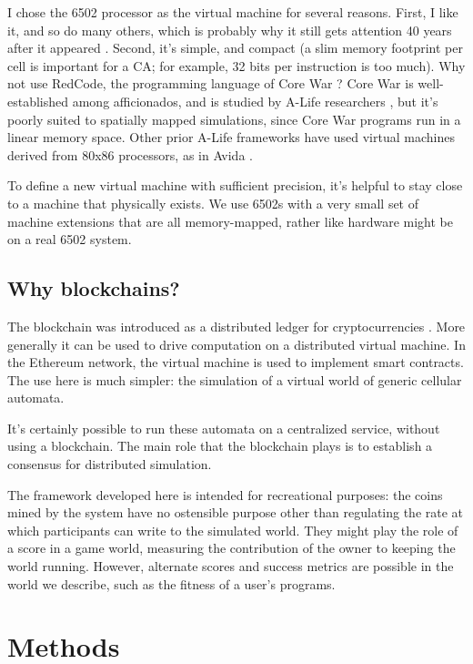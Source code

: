 \documentclass{article}
\begin{document}
I chose the 6502 processor as the virtual machine for several reasons.
First, I like it, and so do many others, which is probably why it still gets attention 40 years after it appeared \cite{JonasKording2017}.
Second, it's simple, and compact (a slim memory footprint per cell is important for a CA; for example, 32 bits per instruction is too much).
Why not use RedCode, the programming language of Core War \cite{Dewdney1984}?
Core War is well-established among afficionados, and is studied by A-Life researchers \cite{VowkWaitSchmidt2004},
but it's poorly suited to spatially mapped simulations, since Core War programs run in a linear memory space.
Other prior A-Life frameworks have used virtual machines derived from 80x86 processors, as in Avida \cite{AdamiBrown1994}.

To define a new virtual machine with sufficient precision, it's helpful to stay close to a machine that physically exists.
We use 6502s with a very small set of machine extensions that are all memory-mapped, rather like hardware might be on a real 6502 system.

\subsection{Why blockchains?}

The blockchain was introduced as a distributed ledger for cryptocurrencies \cite{Nakamoto2008}.
More generally it can be used to drive computation on a distributed virtual machine.
In the Ethereum network, the virtual machine is used to implement smart contracts.
The use here is much simpler: the simulation of a virtual world of generic cellular automata.

It's certainly possible to run these automata on a centralized service, without using a blockchain.
The main role that the blockchain plays is to establish a consensus for distributed simulation.

The framework developed here is intended for recreational purposes: the coins mined by the system
have no ostensible purpose other than regulating the rate at which participants can write to the simulated world.
They might play the role of a score in a game world, measuring the contribution of the owner to keeping the world running.
However, alternate scores and success metrics are possible in the world we describe, such as the fitness of a user's programs.

\section{Methods}
\end{document}
